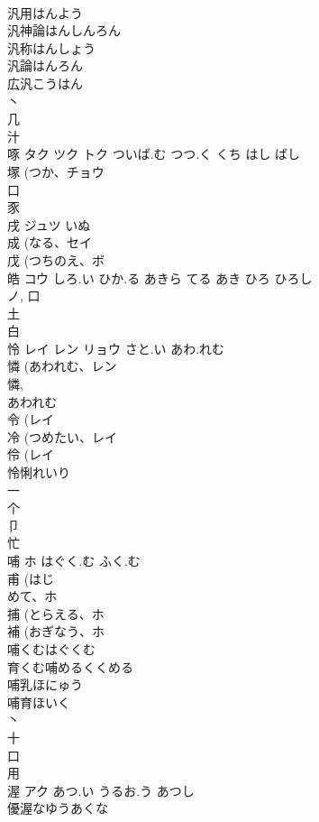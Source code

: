 \documentclass[8pt]{extreport}
\begin{document}
\begin{CJK}{UTF8}{min}
\\	汎用はんよう 
\\	汎神論はんしんろん 
\\	汎称はんしょう 
\\	汎論はんろん 
\\	広汎こうはん 
\\	丶 
\\	几 
\\	汁 
\\	啄	タク ツク トク	ついば.む つつ.く くち はし ばし	
\\	塚 (つか、チョウ 
\\	口 
\\	豕 
\\	戌	ジュツ	いぬ	
\\	成 (なる、セイ 
\\	戊 (つちのえ、ボ 
\\	皓	コウ	しろ.い ひか.る あきら てる あき ひろ ひろし	
\\	ノ, 口 
\\	土 
\\	白 
\\	怜	レイ レン リョウ	さと.い あわ.れむ	
\\	憐 (あわれむ、レン 
\\	憐, 
\\	あわれむ 
\\	令 (レイ 
\\	冷 (つめたい、レイ 
\\	伶 (レイ 
\\	怜悧れいり
\\	一 
\\	个 
\\	卩 
\\	忙 
\\	哺	ホ	はぐく.む ふく.む	
\\	甫 (はじ
\\	めて、ホ 
\\	捕 (とらえる、ホ 
\\	補 (おぎなう、ホ 
\\	哺くむはぐくむ
\\	育くむ哺めるくくめる
\\	哺乳ほにゅう
\\	哺育ほいく
\\	丶 
\\	十 
\\	口 
\\	用 
\\	渥	アク	あつ.い うるお.う あつし	
\\	優渥なゆうあくな 

\end{CJK}
\end{document}
